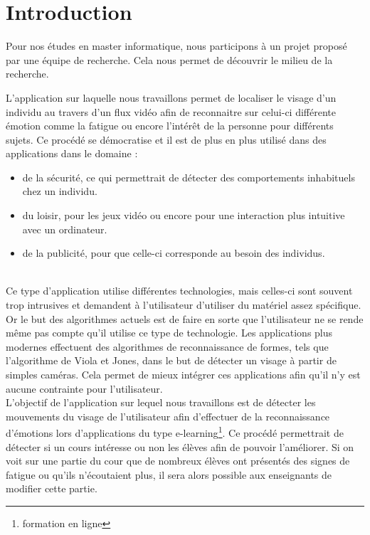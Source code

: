 \section{Introduction}

Pour nos études en master informatique, nous participons à un projet proposé par une 
équipe de recherche. Cela nous permet de découvrir le milieu de la recherche.

L'application sur laquelle nous travaillons permet de localiser le visage
d'un individu au travers d'un flux vidéo afin de reconnaitre sur celui-ci différente
émotion comme la fatigue ou encore l'intérêt de la personne pour différents sujets. Ce procédé
se démocratise et il est de plus en plus utilisé dans des applications dans le domaine : 
\begin{itemize}
 \item de la sécurité, ce qui permettrait de détecter des comportements inhabituels chez un individu.
 \item du loisir, pour les jeux vidéo ou encore pour une interaction plus intuitive avec un ordinateur.
 \item de la publicité, pour que celle-ci corresponde au besoin des individus. 
\end{itemize}
\ \\
Ce type d'application utilise différentes technologies, mais celles-ci sont souvent trop intrusives 
et demandent à l'utilisateur d'utiliser du matériel assez spécifique. Or le but des algorithmes actuels
est de faire en sorte que l'utilisateur ne se rende même pas compte qu'il utilise ce type de technologie. Les applications plus 
modernes effectuent des algorithmes de reconnaissance de formes, tels que l'algorithme de Viola et Jones, dans 
le but de détecter un visage à partir de simples caméras. Cela permet de mieux intégrer ces applications 
afin qu'il n'y est aucune contrainte pour l'utilisateur.\\

L'objectif de l'application sur lequel nous travaillons est de détecter les mouvements
du visage de l'utilisateur afin d'effectuer de la reconnaissance d'émotions lors d'applications
du type e-learning\footnote{formation en ligne}. Ce procédé permettrait de détecter si un cours 
intéresse ou non les élèves afin de pouvoir l'améliorer. Si on voit sur une partie du cour
que de nombreux élèves ont présentés des signes de fatigue ou qu'ils n'écoutaient plus, il sera
alors possible aux enseignants de modifier cette partie.


